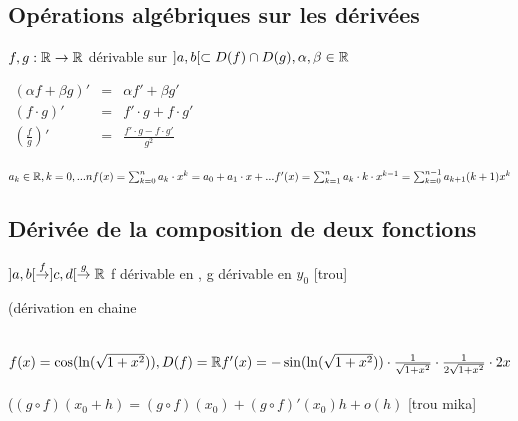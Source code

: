 \documentclass[12pt,a4paper]{article}
\begin{document}
{\subsection{Opérations algébriques sur les dérivées}
$f,g : \mathbb{R} \to \mathbb{R}$ dérivable sur $]a,b[ \subset D(f) \cap D(g), \alpha, \beta \in \mathbb{R}$

\begin{boite}
$\begin{array}{ccc}
(\alpha f + \beta g)' & = & \alpha f' + \beta g'\\
(f\cdot g)' & = & f'\cdot g + f\cdot  g'\\
\left(\frac{f}{g}\right)' & = & \frac{f'\cdot g - f\cdot g'}{g^2}
\end{array}$
\end{boite}

 $a_k \in \mathbb{R}, k = 0,...n\\
f(x) = \sum^n_{k=0} a_k\cdot x^k = a_0 + a_1\cdot x +...\\
f'(x) = \sum^n_{k=1} a_k\cdot k \cdot x^{k-1} = \sum^{n-1}_{k=0}a_{k+1}(k+1)x^k$
\subsection{Dérivée de la composition de deux fonctions}
$]a,b[ \overset{f}{\to} ]c,d[ \overset{g}{\to}\mathbb{R}$ f dérivable en \Xo, g dérivable en $y_0$
[trou]\\
\begin{boite}
\Theoreme (dérivation en chaine\\
\end{boite}
\\
$f(x) = \cos(\ln(\sqrt{1+x^2})), D(f) = \mathbb{R}\\
f'(x) = -\sin(\ln(\sqrt{1+x^2}))\cdot \frac{1}{\sqrt{1+x^2}} \cdot \frac{1}{2\sqrt{1+x^2}} \cdot 2x$\\
\\
($(g \circ f)(x_0 + h) = (g \circ f)(x_0) + (g \circ f)' (x_0) h +o(h)$
[trou mika]

}
\end{document}
